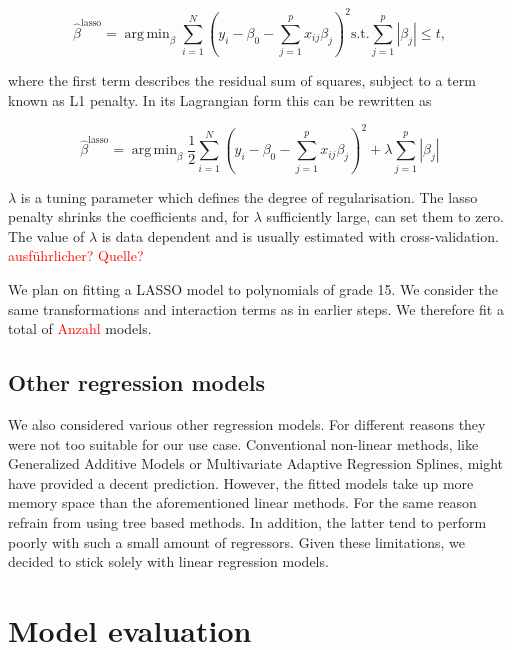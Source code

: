 \documentclass[12pt,a4paper]{article}
\DeclareMathOperator*{\argmin}{arg\,min}
\begin{document}
\begin{equation}
    \hat{\beta}^{\text{lasso}} = \argmin_{\beta} \sum^N_{i=1} \left( y_i - \beta_0 - \sum^p_{j=1} x_{ij} \beta_j \right)^2
    \text{s.t.} \sum^p_{j=1} |\beta_j | \leq t, 
\label{eq:7}
\end{equation}

where the first term describes the residual sum of squares, subject to a
term known as L1 penalty. In its Lagrangian form this can be rewritten
as

\begin{equation}
    \hat{\beta}^{\text{lasso}} = \argmin_{\beta} \frac{1}{2} \sum^N_{i=1} \left( y_i - \beta_0 - \sum^p_{j=1} x_{ij} \beta_j \right)^2 + 
    \lambda \sum^p_{j=1} |\beta_j |
\label{eq:8}
\end{equation}

\(\lambda\) is a tuning parameter which defines the degree of
regularisation. The lasso penalty shrinks the coefficients and, for
\(\lambda\) sufficiently large, can set them to zero. The value of
\(\lambda\) is data dependent and is usually estimated with
cross-validation. \textcolor{red}{ausführlicher? Quelle?}

We plan on fitting a LASSO model to polynomials of grade 15. We consider
the same transformations and interaction terms as in earlier steps. We
therefore fit a total of \textcolor{red}{Anzahl} models.

\hypertarget{other-regression-models}{%
\subsection{Other regression models}\label{other-regression-models}}

We also considered various other regression models. For different
reasons they were not too suitable for our use case. Conventional
non-linear methods, like Generalized Additive Models or Multivariate
Adaptive Regression Splines, might have provided a decent prediction.
However, the fitted models take up more memory space than the
aforementioned linear methods. For the same reason refrain from using
tree based methods. In addition, the latter tend to perform poorly with
such a small amount of regressors. Given these limitations, we decided
to stick solely with linear regression models.

\hypertarget{model-evaluation}{%
\section{Model evaluation}\label{model-evaluation}}
\end{document}
